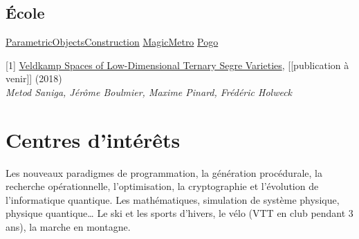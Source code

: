 \documentclass[letterpaper,10pt,sans]{moderncv}
\begin{document}
		\subsection{École}
				{\href{https://github.com/pinam45/UTBM\_IN55\_ParametricObjectsConstruction}{ParametricObjectsConstruction}}
				{\href{https://github.com/TiWinDeTea/MagicMetro}{MagicMetro}}
				{\href{https://github.com/pinam45/UTBM_IA41_Pogo}{Pogo}}


	\vspace*{\deletedSpace}
	\begin{thebibliography}{}
		[1] \href{https://arxiv.org/abs/1806.08965}{Veldkamp Spaces of Low-Dimensional Ternary Segre Varieties}, [[publication à venir]] (2018)\\
		\textit{Metod Saniga, Jérôme Boulmier, Maxime Pinard, Frédéric Holweck}
	\end{thebibliography}


	\vspace*{\deletedSpace}
	\section{Centres d'intérêts}
			{Les nouveaux paradigmes de programmation, la génération procédurale, la recherche opérationnelle, l'optimisation, la cryptographie et l'évolution de l'informatique quantique.}
			{Les mathématiques, simulation de système physique, physique quantique\ldots}
			{Le ski et les sports d'hivers, le vélo (VTT en club pendant 3 ans), la marche en montagne.}
\end{document}
